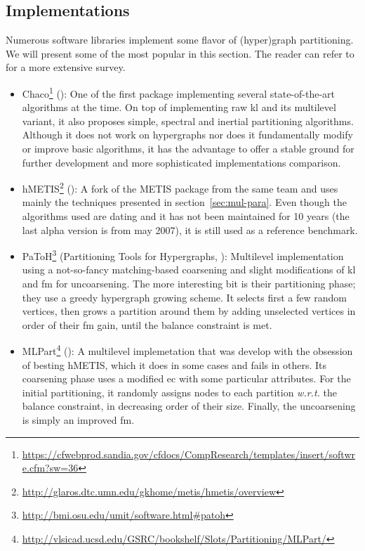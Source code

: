\documentclass[11pt,a4paper]{report} %
\theoremstyle{customdef}
\begin{document}
\subsection{Implementations}\label{sec:impl}
Numerous software libraries implement some flavor of (hyper)graph partitioning.
We will present some of the most popular in this section.
The reader can refer to~\citep{Trifunovic2006} for a more extensive survey.
\begin{itemize}
	\item Chaco\footnote{\url{https://cfwebprod.sandia.gov/cfdocs/CompResearch/templates/insert/softwre.cfm?sw=36}} (\citet{Hendrickson1994}): One of the first package implementing several state-of-the-art algorithms at the time.
	On top of implementing raw \gls{kl} and its multilevel variant, it also proposes simple, spectral and inertial partitioning algorithms.
	Although it does not work on hypergraphs nor does it fundamentally modify or improve basic algorithms, it has the advantage to offer a stable ground for further development and more sophisticated implementations comparison.

	\item hMETIS\footnote{\url{http://glaros.dtc.umn.edu/gkhome/metis/hmetis/overview}} (\citet{Karypis1999}): A fork of the METIS package from the same team and uses mainly the techniques presented in section~\ref{sec:mul-para}.
	Even though the algorithms used are dating and it has not been maintained for 10 years (the last alpha version is from may 2007), it is still used as a reference benchmark.

	\item PaToH\footnote{\url{http://bmi.osu.edu/umit/software.html\#patoh}} (Partitioning Tools for Hypergraphs, \citet{Aykanat2011}): Multilevel implementation using a not-so-fancy matching-based coarsening and slight modifications of \gls{kl} and \gls{fm} for uncoarsening.
	The more interesting bit is their partitioning phase; they use a greedy hypergraph growing scheme.
	It selects first a few random vertices, then grows a partition around them by adding unselected vertices in order of their \gls{fm} gain, until the balance constraint is met.

	\item MLPart\footnote{\url{http://vlsicad.ucsd.edu/GSRC/bookshelf/Slots/Partitioning/MLPart/}} (\citet{Caldwell2000}): A multilevel implemetation that was develop with the obsession of besting hMETIS, which it does in some cases and fails in others.
	Its coarsening phase uses a modified \gls{ec} with some particular attributes.
	For the initial partitioning, it randomly assigns nodes to each partition \textit{w.r.t.} the balance constraint, in decreasing order of their size.
	Finally, the uncoarsening is simply an improved \gls{fm}.


\end{itemize}
\end{document}

